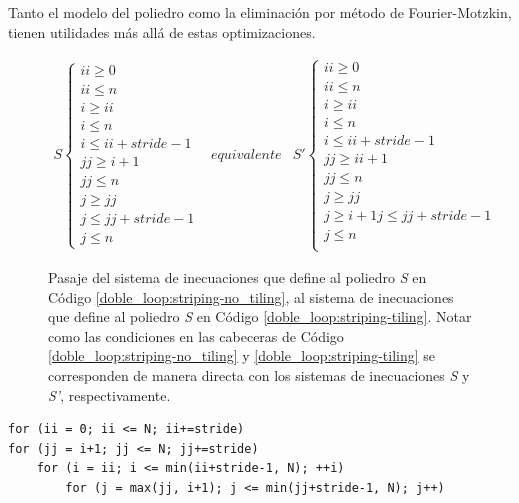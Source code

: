 \documentclass{article}
\begin{document}
Tanto el modelo del poliedro como la eliminación por método de Fourier-Motzkin, tienen utilidades más allá
de estas optimizaciones.

\begin{figure}
\begin{displaymath}
	\begin{array}{rrr}
		S\left\{
			\begin{array}{r}
			ii\geq 0\\
			ii\leq n\\
			i\geq ii\\
			i\leq n\\
			i\leq ii+stride-1\\
			jj\geq i+1\\
			jj\leq n\\
			j\geq jj\\
			j\leq jj+stride-1\\
			j\leq n
			\end{array}
		\right.
		&
		\textit{equivalente a}
		&
		S'\left\{
			\begin{array}{r}
			ii\geq 0\\
			ii\leq n\\
			i\geq ii\\
			i\leq n\\
			i\leq ii+stride-1\\
			jj\geq ii+1\\
			jj\leq n\\
			j\geq jj\\
			j\geq i+1
			j\leq jj+stride-1\\
			j\leq n\\
			\end{array}
		\right.
	\end{array}
\end{displaymath}
	\caption{Pasaje del sistema de inecuaciones que define al poliedro \textit{S} en Código \ref{doble_loop:striping-no_tiling},
	al sistema de inecuaciones que define al poliedro \textit{S} en Código \ref{doble_loop:striping-tiling}. Notar
	como las condiciones en las cabeceras de Código \ref{doble_loop:striping-no_tiling} y \ref{doble_loop:striping-tiling} se corresponden
	de manera directa con los sistemas de inecuaciones \textit{S} y \textit{S'}, respectivamente.}
	\label{fig:fourier_motzkin}
\end{figure}

\begin{lstlisting}[style=CStyle,label=doble_loop:striping-tiling,caption=doble loop con loop-tiling.]
for (ii = 0; ii <= N; ii+=stride)
for (jj = i+1; jj <= N; jj+=stride)
	for (i = ii; i <= min(ii+stride-1, N); ++i)
		for (j = max(jj, i+1); j <= min(jj+stride-1, N); j++)
\end{lstlisting}
\end{document}
